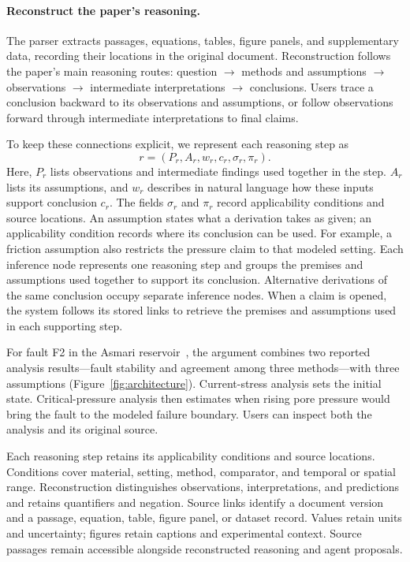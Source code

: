 \documentclass[sigconf,screen,review]{acmart}
\begin{document}
\paragraph{Reconstruct the paper's reasoning.}
The parser extracts passages, equations, tables, figure panels, and supplementary data, recording their locations in the original document. Reconstruction follows the paper's main reasoning routes: question $\rightarrow$ methods and assumptions $\rightarrow$ observations $\rightarrow$ intermediate interpretations $\rightarrow$ conclusions. Users trace a conclusion backward to its observations and assumptions, or follow observations forward through intermediate interpretations to final claims.

\begin{samepage}
To keep these connections explicit, we represent each reasoning step as
\begin{equation}
r=(P_r,A_r,w_r,c_r,\sigma_r,\pi_r).
\end{equation}
Here, $P_r$ lists observations and intermediate findings used together in the step. $A_r$ lists its assumptions, and $w_r$ describes in natural language how these inputs support conclusion $c_r$. The fields $\sigma_r$ and $\pi_r$ record applicability conditions and source locations. An assumption states what a derivation takes as given; an applicability condition records where its conclusion can be used. For example, a friction assumption also restricts the pressure claim to that modeled setting. Each inference node represents one reasoning step and groups the premises and assumptions used together to support its conclusion. Alternative derivations of the same conclusion occupy separate inference nodes. When a claim is opened, the system follows its stored links to retrieve the premises and assumptions used in each supporting step.
\end{samepage}

For fault F2 in the Asmari reservoir~\cite{asmari}, the argument combines two reported analysis results---fault stability and agreement among three methods---with three assumptions (Figure~\ref{fig:architecture}). Current-stress analysis sets the initial state. Critical-pressure analysis then estimates when rising pore pressure would bring the fault to the modeled failure boundary. Users can inspect both the analysis and its original source.

Each reasoning step retains its applicability conditions and source locations. Conditions cover material, setting, method, comparator, and temporal or spatial range. Reconstruction distinguishes observations, interpretations, and predictions and retains quantifiers and negation. Source links identify a document version and a passage, equation, table, figure panel, or dataset record. Values retain units and uncertainty; figures retain captions and experimental context. Source passages remain accessible alongside reconstructed reasoning and agent proposals.
\end{document}
